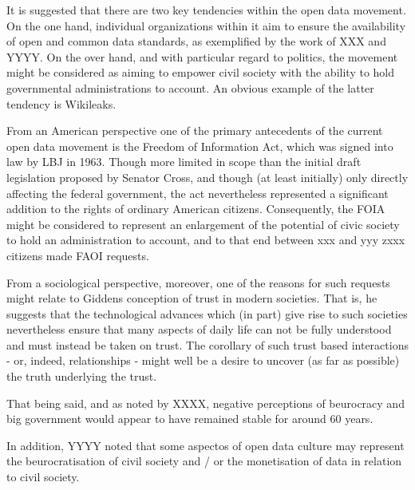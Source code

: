 It is suggested that there are two key tendencies within the open data movement. On the one hand, individual organizations within it aim to ensure the availability of open and common data standards, as exemplified by the work of XXX and YYYY. On the over hand, and with particular regard to politics, the movement might be considered as aiming to empower civil society with the ability to hold governmental administrations to account. An obvious example of the latter tendency is Wikileaks.  

From an American perspective one of the primary antecedents of the current open data movement is the Freedom of Information Act, which was signed into law by LBJ in 1963. Though more limited in scope than the initial draft legislation proposed by Senator Cross, and though (at least initially) only directly affecting the federal government, the act nevertheless represented a significant addition to the rights of ordinary American citizens. Consequently, the FOIA might be considered to represent an enlargement of the potential of civic society to hold an administration to account, and to that end between xxx and yyy zxxx citizens made FAOI requests.

From a sociological perspective, moreover, one of the reasons for such requests might relate to Giddens conception of trust in modern societies. That is, he suggests that the technological advances which (in part) give rise to such societies nevertheless ensure that many aspects of daily life can not be fully understood and must instead be taken on trust. The corollary of such trust based interactions - or, indeed, relationships - might well be a desire to uncover (as far as possible) the truth underlying the trust. 

That being said, and as noted by XXXX, negative perceptions of beurocracy and big government would appear to have remained stable for around 60 years. 

In addition, YYYY noted that some aspectos of open data culture may represent the beurocratisation of civil society and / or the monetisation of data in relation to civil society.